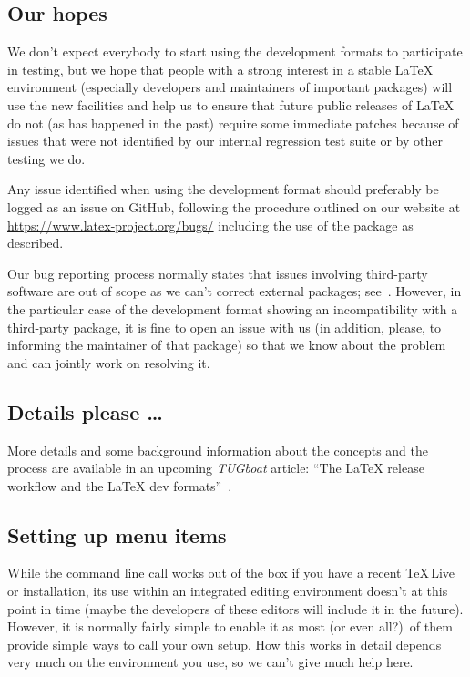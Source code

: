 \documentclass{ltnews}
\providecommand\MiKTeX{\hologo{MiKTeX}}
\providecommand\TL{\TeX\,Live}
\begin{document}
\subsection{Our hopes}

We don’t expect everybody to start using the development formats to
participate in testing, but we hope that people with a strong interest
in a stable \LaTeX{} environment (especially developers and maintainers
of important packages) will use the new facilities and help us to
ensure that future public releases of \LaTeX{} do not (as has happened in
the past) require some immediate patches because of issues that were
not identified by our internal regression test suite or by other
testing
we do.

Any issue identified when using the development format should
preferably be logged as an issue on GitHub, following the procedure
outlined on our website at \url{https://www.latex-project.org/bugs/}
including the use of the  package as described.

Our bug reporting process normally states that issues involving
third-party software are out of scope as we can’t correct external
packages; see~\cite{30:Mittelbach:TB39-1}. However, in the particular
case of the development format showing an incompatibility with a
third-party package, it is fine to open an issue with us (in addition,
please, to informing the maintainer of that package) so that we know
about the problem and can jointly work on resolving it.

\subsection{Details please \ldots}

More details and some background information about the concepts and
the process are available in an upcoming \textsl{TUGboat} article: \enquote{The
  \LaTeX{} release workflow and the \LaTeX{} dev
  formats}~\cite{devformat}.

\subsection{Setting up menu items}

While the command line call works out of the box if you have a recent  
\TL{} or \MiKTeX{} installation, its use within an integrated
editing environment doesn’t at this point in time (maybe the
developers of these editors will include it in the future). However,
it is normally fairly simple to enable it as most (or even all?)\ of
them provide simple ways to call your own setup. How this works in
detail depends very much on the environment you use, so we can’t give
much help here.
\end{document}

